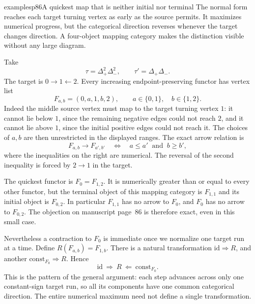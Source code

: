 \begin{dcomment}{examples}{p86}{A quickest map that is neither initial nor terminal}
The normal form reaches each target turning vertex as early as the source permits. It maximizes numerical progress, but the categorical direction reverses whenever the target changes direction. A four-object mapping category makes the distinction visible without any large diagram.

Take
\[
 \tau=\Delta_+^2\Delta_-^2,
 \qquad \tau'=\Delta_+\Delta_-.
\]
The target is $0\to1\leftarrow2$. Every increasing endpoint-preserving functor has vertex list
\[
 F_{a,b}=(0,a,1,b,2),\qquad a\in\{0,1\},\quad b\in\{1,2\}.
\]
Indeed the middle source vertex must map to the target turning vertex $1$: it cannot lie below $1$, since the remaining negative edges could not reach $2$, and it cannot lie above $1$, since the initial positive edges could not reach it. The choices of $a,b$ are then unrestricted in the displayed ranges. The exact arrow relation is
\[
 F_{a,b}\longrightarrow F_{a',b'}
 \quad\Longleftrightarrow\quad a\leq a'\ \text{ and }\ b\geq b',
\]
where the inequalities on the right are numerical. The reversal of the second inequality is forced by $2\to1$ in the target.

The quickest functor is $F_0=F_{1,2}$. It is numerically greater than or equal to every other functor, but the terminal object of this mapping category is $F_{1,1}$ and its initial object is $F_{0,2}$. In particular $F_{1,1}$ has no arrow to $F_0$, and $F_0$ has no arrow to $F_{0,2}$. The objection on manuscript page~86 is therefore exact, even in this small case.

Nevertheless a contraction to $F_0$ is immediate once we normalize one target run at a time. Define $R(F_{a,b})=F_{1,b}$. There is a natural transformation $\mathrm{id}\Rightarrow R$, and another $\mathrm{const}_{F_0}\Rightarrow R$. Hence
\[
 \mathrm{id}\ \Longrightarrow\ R\ \Longleftarrow\ \mathrm{const}_{F_0}.
\]
This is the pattern of the general argument: each step advances across only one constant-sign target run, so all its components have one common categorical direction. The entire numerical maximum need not define a single transformation.
\end{dcomment}

